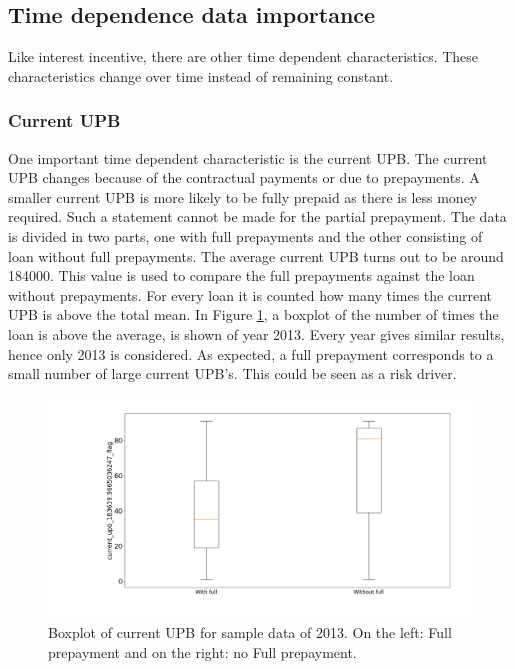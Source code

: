 \subsection{Time dependence data importance}
    Like interest incentive, there are other time
    dependent characteristics. These characteristics change over time instead of remaining constant.
    
    \subsubsection{Current UPB}
    One important time dependent
    characteristic is the current UPB. The current UPB changes
    because of the contractual payments or due to prepayments. 
    A smaller current UPB is more likely to be fully prepaid as
    there is less money required. Such a statement cannot be made
    for the partial prepayment. The data is divided in two parts,
    one with full prepayments and the other consisting of loan
    without full prepayments. The average current UPB turns out to
    be around 184000. This value is used to compare the full
    prepayments against the loan without prepayments. For every loan
    it is counted how many times the current UPB is above the total mean. In Figure \ref{Model_boxplot_current_upb_2013}, a boxplot of the number of times the loan is above the average, is shown of year 2013. Every year gives similar results, hence only 2013 is considered. As expected, a full prepayment corresponds to a small number of large current UPB's. This could be seen as a risk driver. 
    
\begin{figure}[H]
    \centering
    \includegraphics[width=\linewidth]{Figures/current_upb_2013.png}
    \caption{Boxplot of current UPB for sample data of 2013.  On the left: Full prepayment and on the right: no Full prepayment.}
    \label{Model_boxplot_current_upb_2013}
\end{figure}
    
